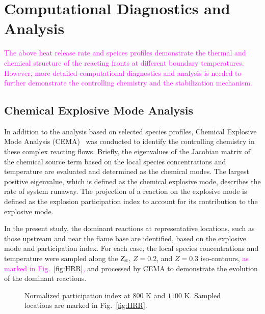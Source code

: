 \documentclass[review,3p,times]{elsarticle}
\begin{document}
\section{Computational Diagnostics and Analysis}
\textcolor{magenta}{The above heat release rate and speices profiles demonstrate the thermal and chemical structure of the reacting fronts at different boundary temperatures.  However, more detailed computational diagnostics and analysis is needed to further demonstrate the controlling chemistry and the stabilization mechanism.}
\subsection{Chemical Explosive Mode Analysis}
In addition to the analysis based on selected species profiles, Chemical Explosive Mode Analysis (CEMA)~\cite{lu10,shan12} was conducted to identify the controlling chemistry in these complex reacting flows.  Briefly, the eigenvalues of the Jacobian matrix of the chemical source term based on the local species concentrations and temperature are evaluated and determined as the chemical modes.  The largest positive eigenvalue, which is defined as the chemical explosive mode, describes the rate of system runaway.  The projection of a reaction on the explosive mode is defined as the explosion participation index to account for its contribution to the explosive mode.  

In the present study, the dominant reactions at representative locations, such as those upstream and near the flame base are identified, based on the explosive mode and participation index.  For each case, the local species concentrations and temperature were sampled along the $Z_{\rm st}$, $Z = 0.2$, and $Z = 0.3$ iso-contours, \textcolor{magenta}{as marked in Fig.~\ref{fig:HRR},} and processed by CEMA to demonstrate the evolution of the dominant reactions.

\begin{figure}
  \centering
  \scriptsize
  
  
  \normalsize
  \caption{Normalized participation index at $800$ K and $1100$ K.  Sampled locations are marked in Fig.~\ref{fig:HRR}.}
  \label{fig:CEMA}
\end{figure}
\end{document}

